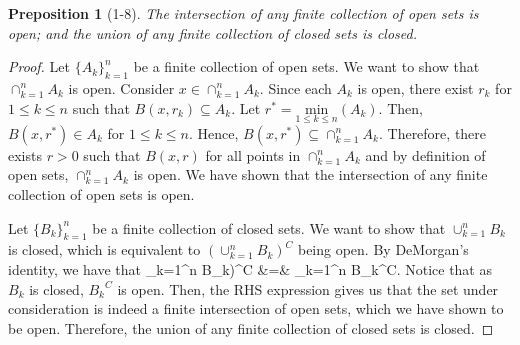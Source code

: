 \documentclass{article} %
\def\eQb#1\eQe{\begin{eqnarray*}#1\end{eqnarray*}}
\theoremstyle{quest}
\newtheorem*{preposition}{Preposition}
\begin{document}
\begin{preposition}[1-8]
The intersection of any finite collection of open sets is open; and the union of any finite
collection of closed sets is closed.
\end{preposition}
\begin{proof} Let $\{ A_k \}_{k=1}^{n}$ be a finite collection of open sets. We want to show
that $\cap_{k=1}^{n} A_k$ is open. Consider $x \in \cap_{k=1}^{n} A_k$. Since each $A_k$ is open, 
there exist $r_k$ for $1 \leq k \leq n$ such that $B(x,r_k) \subseteq A_k$. Let $r^* = 
\underset{1 \leq k 
\leq n}{\text{min}}( A_k )$. Then, $B(x,r^*) \in A_k$ for $1 \leq k \leq n$. Hence,
$B(x,r^*) \subseteq \cap_{k=1}^{n} A_k$. Therefore, there exists $r > 0$ such that
$B(x,r)$ for all points in $\cap_{k=1}^{n} A_k$ and by definition of open sets,
$\cap_{k=1}^{n} A_k$ is open. 
We have shown that the intersection of any finite collection of open sets is open. \\

\smallskip

Let $\{ B_k \}_{k=1}^{n}$ be a finite
collection of closed sets. We want to show that $\cup_{k=1}^{n} B_k$ is closed, which is 
equivalent to $(\cup_{k=1}^{n} B_k)^{C}$ being open. By DeMorgan's identity, we have that
\eQb
(\cup_{k=1}^{n} B_k)^{C} &=& \cap_{k=1}^{n} {B_k}^{C}.
\eQe
Notice that as $B_k$ is closed, ${B_k}^{C}$ is open. Then, 
the RHS expression gives us that the set under consideration is indeed a finite
intersection of open sets, which we have shown to be open. Therefore, the union 
of any finite collection of closed sets is closed.
\end{proof}
\end{document}
